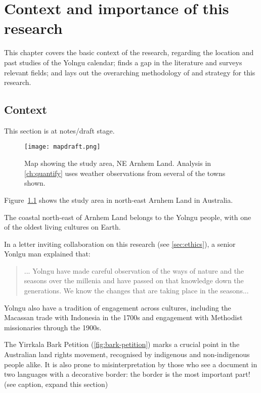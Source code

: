 \chapter{Context and importance of this research}
\label{ch:context}
This chapter covers the basic context of the research,
regarding the location and past studies of the Yolngu calendar;
finds a gap in the literature and surveys relevant fields;
and lays out the overarching methodology of and strategy for this research.


\section{Context}
This section is at notes/draft stage.

\begin{figure}[h]
    \centering
    \texttt{[image: mapdraft.png]}
    \caption[Map showing the study area, NE Arnhem Land]{
        Map showing the study area, NE Arnhem Land.
        Analysis in \autoref{ch:quantify} uses weather observations from several of the towns shown.
        }
    \label{fig:arnhem-map}
\end{figure}

Figure~\ref{fig:arnhem-map} shows the study area in north-east Arnhem Land in Australia.

The coastal north-east of Arnhem Land belongs to the Yolngu people,
with one of the oldest living cultures on Earth.

In a letter inviting collaboration on this research (see \autoref{sec:ethics}),
a senior Yonlgu man explained that:

\blockquote{
    ... Yolngu have made careful observation of the ways of nature and the
    seasons over the millenia and have passed on that knowledge down the
    generations.  We know the changes that are taking place in the seasons...
}

Yolngu also have a tradition of engagement across cultures, including
the Macassan trade with Indonesia in the 1700s and engagement with Methodist
missionaries through the 1900s.

The Yirrkala Bark Petition (\autoref{fig:bark-petition}) marks a crucial
point in the Australian land rights movement, recognised by indigenous and
non-indigenous people alike.  It is also prone to misinterpretation by those
who see a document in two languages with a decorative border: the border
is the most important part!  (see caption, expand this section)



